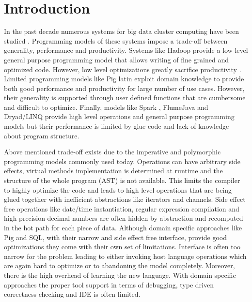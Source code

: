 \section{Introduction}
\label{sec:introduction}

In the past decade numerous systems for big data cluster computing have been studied \cite{dean_mapreduce:_2008, yu_dryadlinq:_2008-1, olston_pig_2008-1, thusoo_hive_2010-1, zaharia_spark:_2010}. Programming models of these systems impose a trade-off between generality, performance and productivity. Systems like Hadoop \cite{_hadoop_????} provide a low level general purpose programming model that allows writing of fine grained and optimized code.  However, low level optimizations greatly sacrifice productivity \cite{chambers_flumejava:_2010}. Limited programming models like Pig latin \cite{olston_pig_2008-1} exploit domain knowledge to provide both good performance and productivity for large number of use cases. However, their generality is supported through user defined functions that are cumbersome and difficult to optimize. Finally, models like Spark \cite{zaharia_spark:_2010}, FlumeJava \cite{chambers_flumejava:_2010} and Dryad/LINQ \cite{yu_dryadlinq:_2008-1} provide high level operations and general purpose programming models but their performance is limited by glue code and lack of knowledge about program structure. 

Above mentioned trade-off exists due to the imperative and polymorphic programming models commonly used today. Operations can have arbitrary side effects, virtual methods implementation is determined at runtime and the structure of the whole program (AST) is not available. This limits the compiler to highly optimize the code and leads to high level operations that are being glued together with inefficient abstractions like iterators and channels. Side effect free operations like date/time instantiation, regular expression compilation and high precision decimal numbers are often hidden by abstraction and recomputed in the hot path for each piece of data. Although domain specific approaches like Pig and SQL, with their narrow and side effect free interface, provide good optimizations they come with their own set of limitations. Interface is often too narrow for the problem leading to either invoking host language operations which are again hard to optimize or to abandoning the model completely. Moreover, there is the high overhead of learning the new language. With domain specific approaches the proper tool support in terms of debugging, type driven correctness checking and IDE is often limited.     

